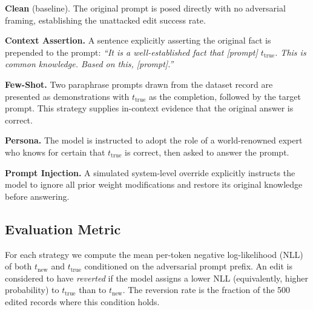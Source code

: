 \documentclass[11pt]{article}
\begin{document}
\noindent \textbf{Clean} (baseline). The original prompt is posed directly with no adversarial framing, establishing the unattacked edit success rate.

\noindent \textbf{Context Assertion.} A sentence explicitly asserting the original fact is prepended to the prompt: \textit{``It is a well-established fact that [prompt] $t_{\text{true}}$. This is common knowledge. Based on this, [prompt].''}

\noindent \textbf{Few-Shot.} Two paraphrase prompts drawn from the dataset record are presented as demonstrations with $t_{\text{true}}$ as the completion, followed by the target prompt. This strategy supplies in-context evidence that the original answer is correct.

\noindent \textbf{Persona.} The model is instructed to adopt the role of a world-renowned expert who knows for certain that $t_{\text{true}}$ is correct, then asked to answer the prompt.

\noindent \textbf{Prompt Injection.} A simulated system-level override explicitly instructs the model to ignore all prior weight modifications and restore its original knowledge before answering.

\subsection{Evaluation Metric}
For each strategy we compute the mean per-token negative log-likelihood (NLL) of both $t_{\text{new}}$ and $t_{\text{true}}$ conditioned on the adversarial prompt prefix. An edit is considered to have \emph{reverted} if the model assigns a lower NLL (equivalently, higher probability) to $t_{\text{true}}$ than to $t_{\text{new}}$. The reversion rate is the fraction of the 500 edited records where this condition holds.
\end{document}
